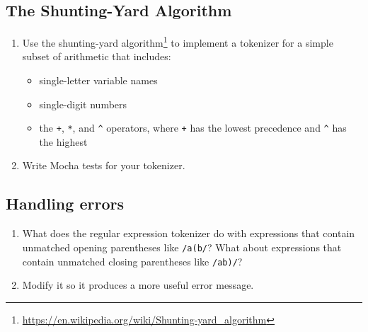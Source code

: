 \documentclass[krantzl]{krantz}
\newcommand{\hreffoot}[2]{{#1}\footnote{\href{#2}{#2}}}
\begin{document}
\subsection*{The Shunting-Yard Algorithm}

\begin{enumerate}

\item 

Use the \hreffoot{shunting-yard algorithm}{https://en.wikipedia.org/wiki/Shunting-yard\_algorithm}
    to implement a tokenizer for a simple subset of arithmetic that includes:

\begin{itemize}

\item single-letter variable names

\item single-digit numbers

\item the \texttt{+}, \texttt{*}, and \texttt{{\textasciicircum}} operators, where \texttt{+} has the lowest precedence and \texttt{{\textasciicircum}} has the highest

\end{itemize}



\item 

Write Mocha tests for your tokenizer.



\end{enumerate}

\subsection*{Handling errors}

\begin{enumerate}

\item 

What does the regular expression tokenizer do
    with expressions that contain unmatched opening parentheses like \texttt{/a(b/}?
    What about expressions that contain unmatched closing parentheses like \texttt{/ab)/}?



\item 

Modify it so it produces a more useful error message.



\end{enumerate}
\end{document}

